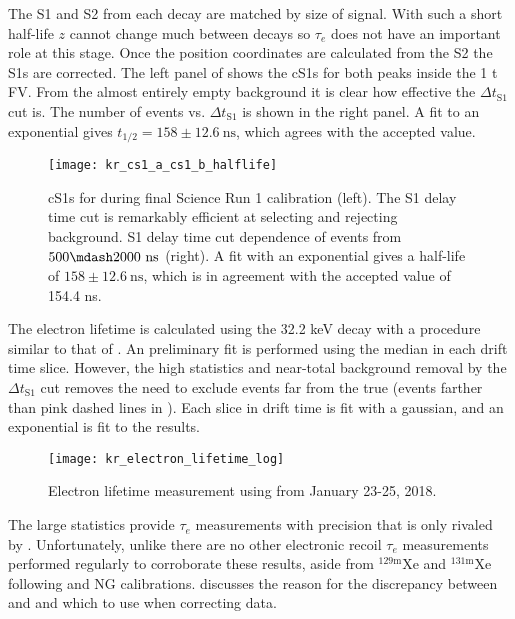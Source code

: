 The S1 and S2 from each decay are matched by size of signal.  With such a short half-life $z$ cannot change much between decays so
$\tau_e$ does not have an important role at this stage.  Once the position coordinates are calculated from the S2 the S1s are
corrected.  The left panel of  shows the cS1s for both peaks inside the
1 t FV.  From the
almost entirely empty background it is clear how effective the $\Delta t_{\mathrm{S1}}$ cut is.  The number of events vs.
$\Delta t_{\mathrm{S1}}$ is shown in the right panel.  A fit to an exponential gives $t_{1/2} = 158 \pm 12.6\ \mathrm{ns}$, which
agrees with the accepted value.

\begin{figure}
\centering
\texttt{[image: kr\_cs1\_a\_cs1\_b\_halflife]}
\caption[cS1s for \metakr during final Science Run 1 calibration (left) and S1 delay time cut dependence of events from
$500 \mdash 2000\ \mathrm{ns}$.]{cS1s for \metakr during final Science Run 1 calibration (left).  The S1 delay time cut is remarkably efficient at selecting
\metakr and rejecting background.  S1 delay time cut dependence of events from $500 \mdash 2000\ \mathrm{ns}$ (right).  A fit with
an exponential gives a half-life of $158 \pm 12.6\ \mathrm{ns}$, which is in agreement with the accepted value of 154.4 ns.}
\label{fig:electron_lifetimes_measurement_kr_cs1_halflife}
\end{figure}

The electron lifetime is calculated using the 32.2 keV decay with a procedure similar to that of \alphadecays
{}.  An preliminary fit is performed using the median \stwob in each drift time
slice.  However, the high statistics and near-total background removal by the $\Delta t_{\mathrm{S1}}$ cut
removes the need to exclude events far from the true \metakr (events farther than pink dashed lines in
).  Each slice in drift time is fit with a gaussian, and an exponential
is fit to the results.

\begin{figure}
\centering
\texttt{[image: kr\_electron\_lifetime\_log]}
\caption{Electron lifetime measurement using \metakr from January 23-25, 2018.}
\label{fig:electron_lifetimes_measurement_kr_elifetime}
\end{figure}

The large statistics provide $\tau_e$ measurements with precision that is only rivaled by .  Unfortunately, unlike
\alphadecays there are no other electronic recoil $\tau_e$ measurements performed regularly to corroborate these results, aside from
$\mathrm{^{129m}Xe}$ and $\mathrm{^{131m}Xe}$ following \ambe and NG calibrations.  
discusses the reason for the discrepancy between \alphadecays and \metakr and which to use when correcting data.



